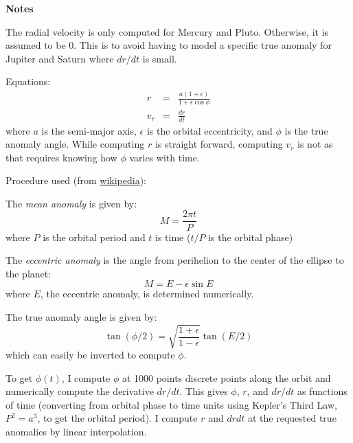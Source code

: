 \documentclass[11pt]{article}
\newcommand\descrip[1]{\textsf{\textbf{\large{#1}}}\\}
\begin{document}
\descrip{Notes}
\begin{compactenum} \listup
\item The radial velocity is only computed for Mercury and Pluto. Otherwise, it
is assumed to be 0. This is to avoid having to model a specific true anomaly
for Jupiter and Saturn where $dr/dt$ is small.
\item Equations:
  \begin{eqnarray}
  r & = & \frac{a (1+\epsilon)}{1 + \epsilon \cos \phi} \\
  v_r & = & \frac{dr}{dt} 
  \end{eqnarray}
  where $a$ is the semi-major axis, $\epsilon$ is the orbital eccentricity, and
  $\phi$ is the true anomaly angle. While computing $r$ is straight forward,
  computing $v_r$ is not as that requires knowing how $\phi$ varies with time.

\item Procedure used (from
\href{http://en.wikipedia.org/wiki/Kepler%27s_laws_of_planetary_motion#Computing_position_as_a_function_of_time}{wikipedia}):
  \begin{compactenum}
  \item The \textit{mean anomaly} is given by:
    \begin{equation}
    M = \frac{2\pi t}{P}
    \end{equation}
    where $P$ is the orbital period and $t$ is time ($t/P$ is the orbital phase)
  \item The \textit{eccentric anomaly} is the angle from perihelion to the
  center of the ellipse to the planet:
    \begin{equation}
    M = E - \epsilon \sin E
    \end{equation}
    where $E$, the eccentric anomaly, is determined numerically.
  \item The true anomaly angle is given by:
    \begin{equation}
    \tan (\phi/2) = \sqrt{\frac{1+\epsilon}{1-\epsilon}} \tan (E/2)
    \end{equation}
    which can easily be inverted to compute $\phi$.
  \item To get $\phi(t)$, I compute $\phi$ at 1000 points discrete points along
  the orbit and numerically compute the derivative $dr/dt$. This gives $\phi$,
  $r$, and $dr/dt$ as functions of time (converting from orbital phase to time
  units using Kepler's Third Law, $P^2 = a^3$, to get the orbital period). 
  I compute $r$ and $drdt$ at the
  requested true anomalies by linear interpolation.
  \end{compactenum}

\end{compactenum}
\end{document}
